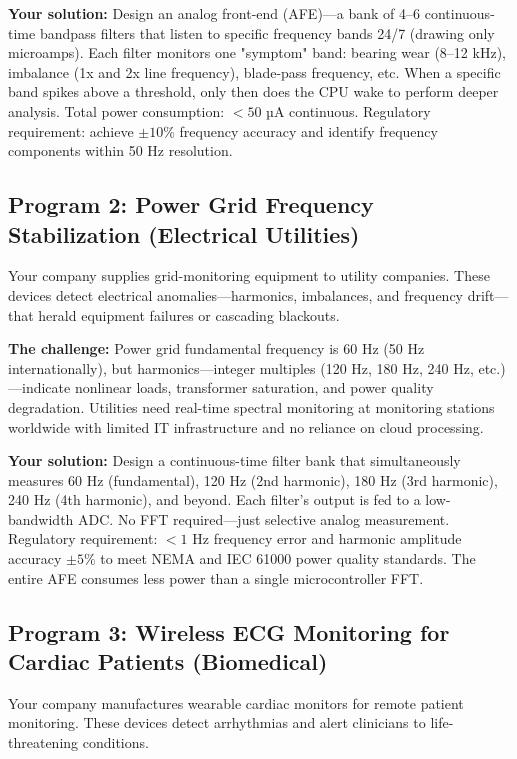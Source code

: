 \documentclass[11pt,letterpaper]{article}
\begin{document}
\textbf{Your solution:} Design an analog front-end (AFE)—a bank of 4--6 continuous-time bandpass filters that listen to specific frequency bands 24/7 (drawing only microamps). Each filter monitors one "symptom" band: bearing wear (8--12 kHz), imbalance (1x and 2x line frequency), blade-pass frequency, etc. When a specific band spikes above a threshold, only then does the CPU wake to perform deeper analysis. Total power consumption: $< 50$ µA continuous. Regulatory requirement: achieve $\pm 10\%$ frequency accuracy and identify frequency components within 50 Hz resolution.

\subsection{Program 2: Power Grid Frequency Stabilization (Electrical Utilities)}

Your company supplies grid-monitoring equipment to utility companies. These devices detect electrical anomalies—harmonics, imbalances, and frequency drift—that herald equipment failures or cascading blackouts.

\textbf{The challenge:} Power grid fundamental frequency is 60 Hz (50 Hz internationally), but harmonics—integer multiples (120 Hz, 180 Hz, 240 Hz, etc.)—indicate nonlinear loads, transformer saturation, and power quality degradation. Utilities need real-time spectral monitoring at monitoring stations worldwide with limited IT infrastructure and no reliance on cloud processing.

\textbf{Your solution:} Design a continuous-time filter bank that simultaneously measures 60 Hz (fundamental), 120 Hz (2nd harmonic), 180 Hz (3rd harmonic), 240 Hz (4th harmonic), and beyond. Each filter's output is fed to a low-bandwidth ADC. No FFT required—just selective analog measurement. Regulatory requirement: $< 1$ Hz frequency error and harmonic amplitude accuracy $\pm 5\%$ to meet NEMA and IEC 61000 power quality standards. The entire AFE consumes less power than a single microcontroller FFT.

\subsection{Program 3: Wireless ECG Monitoring for Cardiac Patients (Biomedical)}

Your company manufactures wearable cardiac monitors for remote patient monitoring. These devices detect arrhythmias and alert clinicians to life-threatening conditions.
\end{document}

